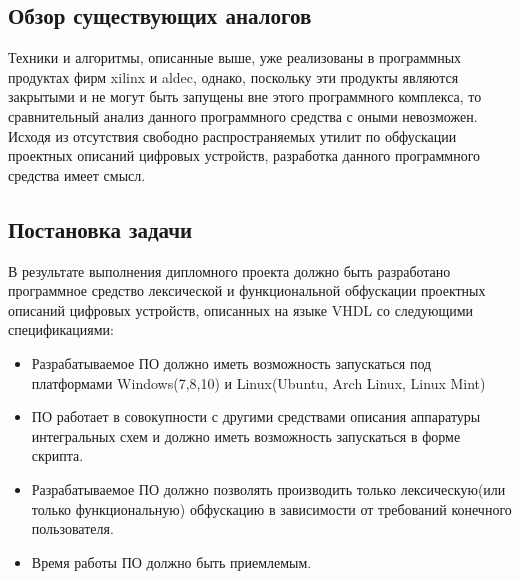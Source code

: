 \subsection{Обзор существующих аналогов}

Техники и алгоритмы, описанные выше, уже реализованы в программных продуктах фирм xilinx и aldec\cite{aldec_obf}, однако, поскольку эти продукты являются закрытыми и не могут быть запущены вне этого программного комплекса, то сравнительный анализ данного программного средства с оными невозможен. Исходя из отсутствия свободно распространяемых утилит по обфускации проектных описаний цифровых устройств, разработка данного программного средства имеет смысл.


\subsection{Постановка задачи}
В результате выполнения дипломного проекта должно быть разработано программное средство лексической и функциональной обфускации проектных описаний цифровых устройств, описанных на языке VHDL со следующими спецификациями:
\begin{itemize}
\item Разрабатываемое ПО должно иметь возможность запускаться под платформами Windows(7,8,10) и Linux(Ubuntu, Arch Linux, Linux Mint)
\item ПО работает в совокупности с другими средствами описания аппаратуры интегральных схем и должно иметь возможность запускаться в форме скрипта.
\item Разрабатываемое ПО должно позволять производить только лексическую(или только функциональную) обфускацию в зависимости от требований конечного пользователя.
\item Время работы ПО должно быть приемлемым.
\end{itemize}


